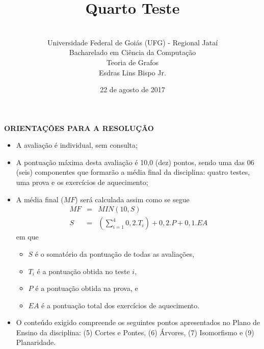 \documentclass[12pt,a4paper,oneside]{article}
\author{\\Universidade Federal de Goiás (UFG) - Regional Jataí\\Bacharelado em Ciência da Computação \\Teoria de Grafos \\Esdras Lins Bispo Jr.}
\title{\sc \huge Quarto Teste}
\date{22 de agosto de 2017}
\begin{document}
\maketitle

{\bf ORIENTAÇÕES PARA A RESOLUÇÃO}

\footnotesize

\begin{itemize}
	\item A avaliação é individual, sem consulta;
	\item A pontuação máxima desta avaliação é 10,0 (dez) pontos, sendo uma das 06 (seis) componentes que formarão a média final da disciplina: quatro testes, uma prova e os exercícios de aquecimento;
	\item A média final ($MF$) será calculada assim como se segue
	\begin{eqnarray}
		MF & = & MIN(10, S) \nonumber \\
		S & = & (\sum_{i=1}^{4} 0,2.T_i ) + 0,2.P  + 0,1.EA \nonumber
	\end{eqnarray}
	em que 
	\begin{itemize}
		\item $S$ é o somatório da pontuação de todas as avaliações,
		\item $T_i$ é a pontuação obtida no teste $i$,
		\item $P$ é a pontuação obtida na prova, e
		\item $EA$ é a pontuação total dos exercícios de aquecimento.
	\end{itemize}
	\item O conteúdo exigido compreende os seguintes pontos apresentados no Plano de Ensino da disciplina: (5) Cortes e Pontes, (6) Árvores, (7) Isomorfismo e (9) Planaridade.
\end{itemize}


\begin{center}
\end{center}

\newpage

\normalsize
\end{document}
